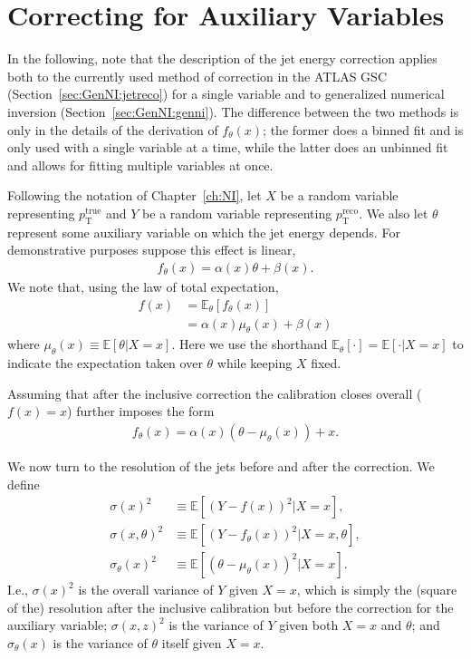 \section{Correcting for Auxiliary Variables}
\label{sec:GenNI_app:auxiliary}

In the following, note that the description of the jet energy correction applies both to the currently used method of correction in the ATLAS GSC (Section~\ref{sec:GenNI:jetreco}) for a single variable and to generalized numerical inversion (Section~\ref{sec:GenNI:genni}).
The difference between the two methods is only in the details of the derivation of $f_\theta(x)$; the former does a binned fit and is only used with a single variable at a time, while the latter does an unbinned fit and allows for fitting multiple variables at once.

Following the notation of Chapter~\ref{ch:NI}, let $X$ be a random variable representing $p_\text{T}^\text{true}$ and $Y$ be a random variable representing $p_\text{T}^\text{reco}$.
We also let $\theta$ represent some auxiliary variable on which the jet energy depends.
For demonstrative purposes suppose this effect is linear,
\begin{align}
  f_\theta(x) = \alpha(x)\theta+\beta(x).
\end{align}
We note that, using the law of total expectation,
\begin{align}
  f(x) &= \mathbb{E}_\theta\left[f_\theta(x)\right]\\
       &= \alpha(x)\mu_\theta(x)+\beta(x)
\end{align}
where $\mu_\theta(x) \equiv \mathbb{E}\left[\theta|X=x\right]$.
Here we use the shorthand $\mathbb{E}_\theta[\cdot] = \mathbb{E}[\cdot|X=x]$ to indicate the expectation taken over $\theta$ while keeping $X$ fixed.

Assuming that after the inclusive correction the calibration closes overall ($f(x)=x$) further imposes the form
\begin{align}
  f_\theta(x) = \alpha(x)(\theta-\mu_\theta(x))+x.
\end{align}

We now turn to the resolution of the jets before and after the correction.
We define
\begin{align}
  \sigma(x)^2 &\equiv \mathbb{E}\left[\left(Y-f(x)\right)^2|X=x\right],\\
  \sigma(x,\theta)^2 &\equiv \mathbb{E}\left[\left(Y-f_\theta(x)\right)^2|X=x,\theta\right],\\
  \sigma_\theta(x)^2 &\equiv \mathbb{E}\left[\left(\theta-\mu_\theta(x)\right)^2|X=x\right].
\end{align}
I.e., $\sigma(x)^2$ is the overall variance of $Y$ given $X=x$, which is simply the (square of the) resolution after the inclusive calibration but before the correction for the auxiliary variable; $\sigma(x,z)^2$ is the variance of $Y$ given both $X=x$ and $\theta$; and $\sigma_\theta(x)$ is the variance of $\theta$ itself given $X=x$.

